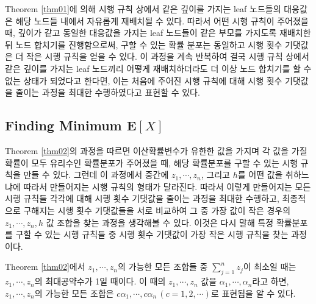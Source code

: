 \documentclass[11pt]{article}
\begin{document}
Theorem \ref{thm01}에 의해 시행 규칙 상에서 같은 깊이를 가지는 leaf 노드들의 대응값은 해당 노드들 내에서 자유롭게 재배치될 수 있다. 따라서 어떤 시행 규칙이 주어졌을 때, 깊이가 같고 동일한 대응값을 가지는 leaf 노드들이 같은 부모를 가지도록 재배치한 뒤 노드 합치기를 진행함으로써, 구할 수 있는 확률 분포는 동일하고 시행 횟수 기댓값은 더 작은 시행 규칙을 얻을 수 있다. 이 과정을 계속 반복하여 결국 시행 규칙 상에서 같은 깊이를 가지는 leaf 노드끼리 어떻게 재배치하더라도 더 이상 노드 합치기를 할 수 없는 상태가 되었다고 한다면, 이는 처음에 주어진 시행 규칙에 대해 시행 횟수 기댓값을 줄이는 과정을 최대한 수행하였다고 표현할 수 있다.

\subsection{Finding Minimum $\textbf{E}[X]$} \label{subsection3-5}
Theorem \ref{thm02}의 과정을 따르면 이산확률변수가 유한한 값을 가지며 각 값을 가질 확률이 모두 유리수인 확률분포가 주어졌을 때, 해당 확률분포를 구할 수 있는 시행 규칙을 만들 수 있다. 그런데 이 과정에서 중간에 $z_{1}, \cdots, z_{n}$, 그리고 $h$를 어떤 값을 취하느냐에 따라서 만들어지는 시행 규칙의 형태가 달라진다. 따라서 이렇게 만들어지는 모든 시행 규칙들 각각에 대해 시행 횟수 기댓값을 줄이는 과정을 최대한 수행하고, 최종적으로 구해지는 시행 횟수 기댓값들을 서로 비교하여 그 중 가장 값이 작은 경우의 $z_{1}, \cdots, z_{n}, h$ 값 조합을 찾는 과정을 생각해볼 수 있다. 이것은 다시 말해 특정 확률분포를 구할 수 있는 시행 규칙들 중 시행 횟수 기댓값이 가장 작은 시행 규칙을 찾는 과정이다.

Theorem \ref{thm02}에서 $z_{1}, \cdots, z_{n}$의 가능한 모든 조합들 중 $\displaystyle \sum_{j=1}^{n}z_{j}$이 최소일 때는 $z_{1}, \cdots, z_{n}$의 최대공약수가 1일 때이다. 이 때의 $z_{1}, \cdots, z_{n}$ 값을 $\alpha_{1}, \cdots, \alpha_{n}$라고 하면, $z_{1}, \cdots, z_{n}$의 가능한 모든 조합은 $c\alpha_{1}, \cdots, c\alpha_{n} \, (c = 1, 2, \cdots)$로 표현됨을 알 수 있다.
\end{document}
